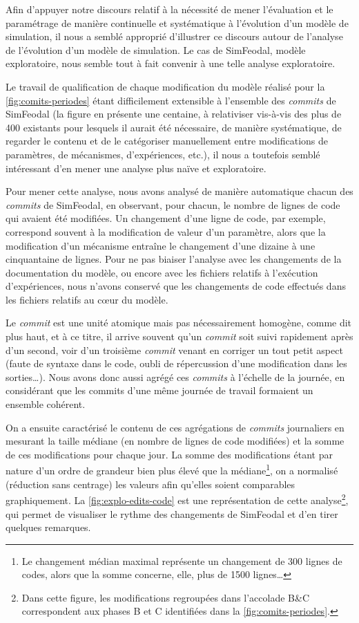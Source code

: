 Afin d'appuyer notre discours relatif à la nécessité de mener l'évaluation et le paramétrage de manière continuelle et systématique à l'évolution d'un modèle de simulation, il nous a semblé approprié d'illustrer ce discours autour de l'analyse de l'évolution d'un modèle de simulation.
Le cas de SimFeodal, modèle exploratoire, nous semble tout à fait convenir à une telle analyse exploratoire.

Le travail de qualification de chaque modification du modèle réalisé pour la \cref{fig:comits-periodes} étant difficilement extensible à l'ensemble des \textit{commits} de SimFeodal (la figure en présente une centaine, à relativiser vis-à-vis des plus de 400 existants pour lesquels il aurait été nécessaire, de manière systématique, de regarder le contenu et de le catégoriser manuellement entre modifications de paramètres, de mécanismes, d'expériences, etc.), il nous a toutefois semblé intéressant d'en mener une analyse plus naïve et exploratoire.

Pour mener cette analyse, nous avons analysé de manière automatique chacun des \textit{commits} de SimFeodal, en observant, pour chacun, le nombre de lignes de code qui avaient été modifiées.
Un changement d'une ligne de code, par exemple, correspond souvent à la modification de valeur d'un paramètre, alors que la modification d'un mécanisme entraîne le changement d'une dizaine à une cinquantaine de lignes.
Pour ne pas biaiser l'analyse avec les changements de la documentation du modèle, ou encore avec les fichiers relatifs à l'exécution d'expériences, nous n'avons conservé que les changements de code effectués dans les fichiers relatifs au cœur du modèle.

Le \textit{commit} est une unité \og atomique\fg{} mais pas nécessairement homogène, comme dit plus haut, et à ce titre, il arrive souvent qu'un \textit{commit} soit suivi rapidement après d'un second, voir d'un troisième \textit{commit} venant en corriger un tout petit aspect (faute de syntaxe dans le code, oubli de répercussion d'une modification dans les sorties\ldots).
Nous avons donc aussi agrégé ces \textit{commits} à l'échelle de la journée, en considérant que les commits d'une même journée de travail formaient un ensemble cohérent.

On a ensuite caractérisé le contenu de ces agrégations de \textit{commits} journaliers en mesurant la taille médiane (en nombre de lignes de code modifiées) et la somme de ces modifications pour chaque jour.
La somme des modifications étant par nature d'un ordre de grandeur bien plus élevé que la médiane\footnote{
	Le changement médian maximal représente un changement de 300 lignes de codes, alors que la somme concerne, elle, plus de 1500 lignes\ldots
}, on a normalisé (réduction sans centrage) les valeurs afin qu'elles soient comparables graphiquement.
La \cref{fig:explo-edits-code} est une représentation de cette analyse\footnote{
	Dans cette figure, les modifications regroupées dans l'accolade \og B\&C\fg{} correspondent aux phases B et C identifiées dans la  \cref{fig:comits-periodes}.
}, qui permet de visualiser le \og rythme\fg{} des changements de SimFeodal et d'en tirer quelques remarques.

